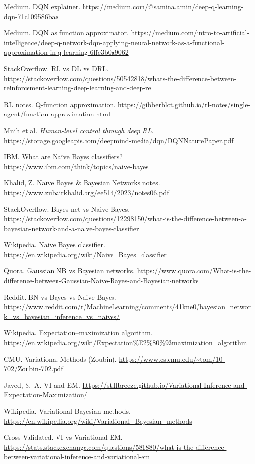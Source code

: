 \documentclass[11pt]{article}
\begin{document}
\begin{enumerate}[leftmargin=1.2em,label={[\arabic*]}]
\item Medium. DQN explainer. \url{https://medium.com/@samina.amin/deep-q-learning-dqn-71c109586bae}
\item Medium. DQN as function approximator. \url{https://medium.com/intro-to-artificial-intelligence/deep-q-network-dqn-applying-neural-network-as-a-functional-approximation-in-q-learning-6ffe3b0a9062}
\item StackOverflow. RL vs DL vs DRL. \url{https://stackoverflow.com/questions/50542818/whats-the-difference-between-reinforcement-learning-deep-learning-and-deep-re}
\item RL notes. Q-function approximation. \url{https://gibberblot.github.io/rl-notes/single-agent/function-approximation.html}
\item Mnih et al. \emph{Human-level control through deep RL}. \url{https://storage.googleapis.com/deepmind-media/dqn/DQNNaturePaper.pdf}
\item IBM. What are Naïve Bayes classifiers? \url{https://www.ibm.com/think/topics/naive-bayes}
\item Khalid, Z. Naïve Bayes \& Bayesian Networks notes. \url{https://www.zubairkhalid.org/ee514/2023/notes06.pdf}
\item StackOverflow. Bayes net vs Naive Bayes. \url{https://stackoverflow.com/questions/12298150/what-is-the-difference-between-a-bayesian-network-and-a-naive-bayes-classifier}
\item Wikipedia. Naive Bayes classifier. \url{https://en.wikipedia.org/wiki/Naive_Bayes_classifier}
\item Quora. Gaussian NB vs Bayesian networks. \url{https://www.quora.com/What-is-the-difference-between-Gaussian-Naive-Bayes-and-Bayesian-networks}
\item Reddit. BN vs Bayes vs Naive Bayes. \url{https://www.reddit.com/r/MachineLearning/comments/41kne0/bayesian_network_vs_bayesian_inference_vs_naives/}
\item Wikipedia. Expectation--maximization algorithm. \url{https://en.wikipedia.org/wiki/Expectation%E2%80%93maximization_algorithm}
\item CMU. Variational Methods (Zoubin). \url{https://www.cs.cmu.edu/~tom/10-702/Zoubin-702.pdf}
\item Javed, S.\ A. VI and EM. \url{https://stillbreeze.github.io/Variational-Inference-and-Expectation-Maximization/}
\item Wikipedia. Variational Bayesian methods. \url{https://en.wikipedia.org/wiki/Variational_Bayesian_methods}
\item Cross Validated. VI vs Variational EM. \url{https://stats.stackexchange.com/questions/581880/what-is-the-difference-between-variational-inference-and-variational-em}

\end{enumerate}
\end{document}
